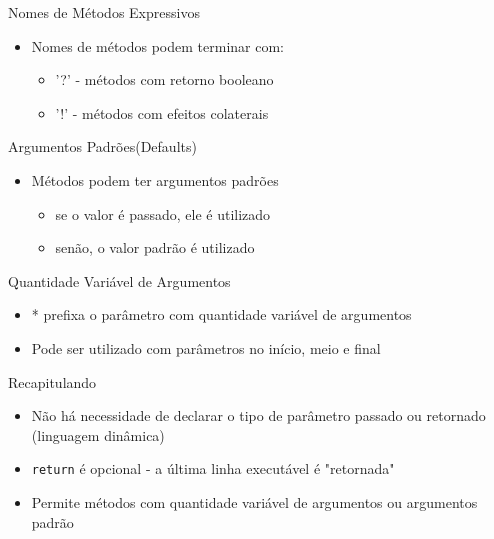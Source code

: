\begin{frame}[fragile,t]{Nomes de Métodos Expressivos}
  \begin{itemize}
    \item Nomes de métodos podem terminar com:
    \begin{itemize}
    	\item \alert{'?'} - métodos com retorno booleano
    	\item \alert{'!'} - métodos com efeitos colaterais
    \end{itemize}
    
	
  \end{itemize}   
\end{frame}

\begin{frame}[fragile,t]{Argumentos Padrões(Defaults)}
  \begin{itemize}
    \item Métodos podem ter argumentos padrões
    \begin{itemize}
    	\item se o valor é passado, ele é utilizado
    	\item senão, o valor padrão é utilizado
    \end{itemize}
  \end{itemize}  
  
\end{frame}

\begin{frame}[fragile,t]{Quantidade Variável de Argumentos}
  \begin{itemize}
    \item \alert{*} prefixa o parâmetro com quantidade variável de argumentos
  \end{itemize}
  \begin{itemize}
    \item Pode ser utilizado com parâmetros no início, meio e final
  \end{itemize}
  
\end{frame}

\begin{frame}[fragile,t]{Recapitulando}
  \begin{itemize}
    \item \alert{Não há necessidade} de declarar o tipo de parâmetro passado ou retornado (linguagem dinâmica)
    \item \verb!return! é \alert{opcional} - a última linha executável é "retornada"
    \item Permite métodos com \alert{quantidade variável} de argumentos ou argumentos padrão
  \end{itemize}
\end{frame}




